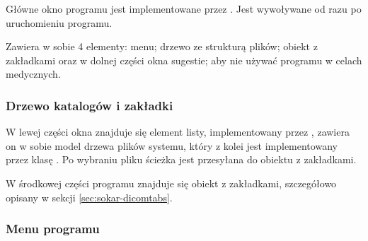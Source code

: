 \label{sec:sokar-window}

\par
Główne okno programu jest implementowane przez .
Jest wywoływane od razu po uruchomieniu programu.
\par
Zawiera w sobie 4 elementy: menu; drzewo ze strukturą plików; obiekt z zakładkami oraz w dolnej części okna sugestie; aby nie używać programu w celach medycznych.

\subsubsection{Drzewo katalogów i zakładki}

\par
W lewej części okna znajduje się element listy, implementowany przez , zawiera on w sobie model drzewa plików systemu, który z kolei jest implementowany przez klasę .
Po wybraniu pliku ścieżka jest przesyłana do obiektu z zakładkami.
\par
W środkowej części programu znajduje się obiekt z zakładkami, szczegółowo opisany w sekcji \ref{sec:sokar-dicomtabs}.

\subsubsection{Menu programu}
\label{sec:sokar-window-menu}

